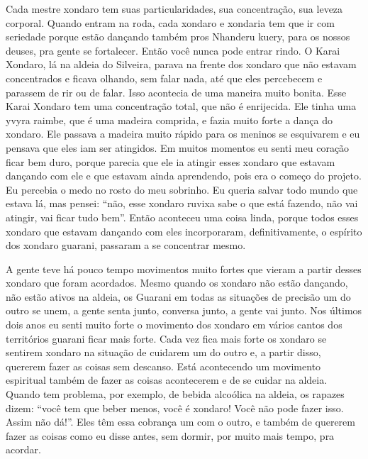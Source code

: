 \documentclass{article}
\begin{document}
Cada mestre xondaro tem suas particularidades, sua concentra\c{c}\~ao,
sua leveza corporal. Quando entram na roda, cada xondaro e xondaria tem
que ir com seriedade porque est\~ao dan\c{c}ando tamb\'em pros Nhanderu
kuery, para os nossos deuses, pra gente se fortalecer. Ent\~ao voc\^e
nunca pode entrar rindo. O Karai Xondaro, l\'a na aldeia do Silveira,
parava na frente dos xondaro que n\~ao estavam concentrados e ficava
olhando, sem falar nada, at\'e que eles percebecem e parassem de rir ou
de falar. Isso acontecia de uma maneira muito bonita. Esse Karai
Xondaro tem uma concentra\c{c}\~ao total, que n\~ao \'e enrijecida. Ele
tinha uma yvyra raimbe, que \'e uma madeira comprida, e fazia muito
forte a dan\c{c}a do xondaro. Ele passava a madeira muito r\'apido para
os meninos se esquivarem e eu pensava que eles iam ser atingidos. Em
muitos momentos eu senti meu cora\c{c}\~ao ficar bem duro, porque
parecia que ele ia atingir esses xondaro que estavam dan\c{c}ando com
ele e que estavam ainda aprendendo, pois era o come\c{c}o do projeto.
Eu percebia o medo no rosto do meu sobrinho. Eu queria salvar todo
mundo que estava l\'a, mas pensei: {\textquotedblleft}n\~ao, esse
xondaro ruvixa sabe o que est\'a fazendo, n\~ao vai atingir, vai ficar
tudo bem{\textquotedblright}. Ent\~ao aconteceu uma coisa linda, porque
todos esses xondaro que estavam dan\c{c}ando com eles incorporaram,
definitivamente, o esp\'irito dos xondaro guarani, passaram a se
concentrar mesmo.

A gente teve h\'a pouco tempo movimentos muito fortes que vieram a
partir desses xondaro que foram acordados. Mesmo quando os xondaro
n\~ao est\~ao dan\c{c}ando, n\~ao est\~ao ativos na aldeia, os Guarani
em todas as situa\c{c}\~oes de precis\~ao um do outro se unem, a gente
senta junto, conversa junto, a gente vai junto. Nos \'ultimos dois anos
eu senti muito forte o movimento dos xondaro em v\'arios cantos dos
territ\'orios guarani ficar mais forte. Cada vez fica mais forte os
xondaro se sentirem xondaro na situa\c{c}\~ao de cuidarem um do outro
e, a partir disso, quererem fazer as coisas sem descanso. Est\'a
acontecendo um movimento espiritual tamb\'em de fazer as coisas
acontecerem e de se cuidar na aldeia. Quando tem problema, por exemplo,
de bebida alco\'olica na aldeia, os rapazes dizem:
{\textquotedblleft}voc\^e tem que beber menos, voc\^e \'e xondaro!
Voc\^e n\~ao pode fazer isso. Assim n\~ao d\'a!{\textquotedblright}.
Eles t\^em essa cobran\c{c}a um com o outro, e tamb\'em de quererem
fazer as coisas como eu disse antes, sem dormir, por muito mais tempo,
pra acordar.
\end{document}

